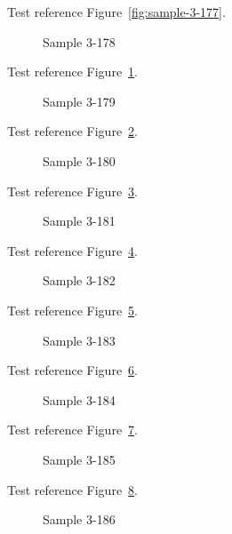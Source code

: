 Test reference Figure~\ref{fig:sample-3-177}.

\begin{figure}[tbhp]
\caption{Sample 3-178}
\label{fig:sample-3-178}
\end{figure}

Test reference Figure~\ref{fig:sample-3-178}.

\begin{figure}[tbhp]
\caption{Sample 3-179}
\label{fig:sample-3-179}
\end{figure}

Test reference Figure~\ref{fig:sample-3-179}.

\begin{figure}[tbhp]
\caption{Sample 3-180}
\label{fig:sample-3-180}
\end{figure}

Test reference Figure~\ref{fig:sample-3-180}.

\begin{figure}[tbhp]
\caption{Sample 3-181}
\label{fig:sample-3-181}
\end{figure}

Test reference Figure~\ref{fig:sample-3-181}.

\begin{figure}[tbhp]
\caption{Sample 3-182}
\label{fig:sample-3-182}
\end{figure}

Test reference Figure~\ref{fig:sample-3-182}.

\begin{figure}[tbhp]
\caption{Sample 3-183}
\label{fig:sample-3-183}
\end{figure}

Test reference Figure~\ref{fig:sample-3-183}.

\begin{figure}[tbhp]
\caption{Sample 3-184}
\label{fig:sample-3-184}
\end{figure}

Test reference Figure~\ref{fig:sample-3-184}.

\begin{figure}[tbhp]
\caption{Sample 3-185}
\label{fig:sample-3-185}
\end{figure}

Test reference Figure~\ref{fig:sample-3-185}.

\begin{figure}[tbhp]
\caption{Sample 3-186}
\label{fig:sample-3-186}
\end{figure}

